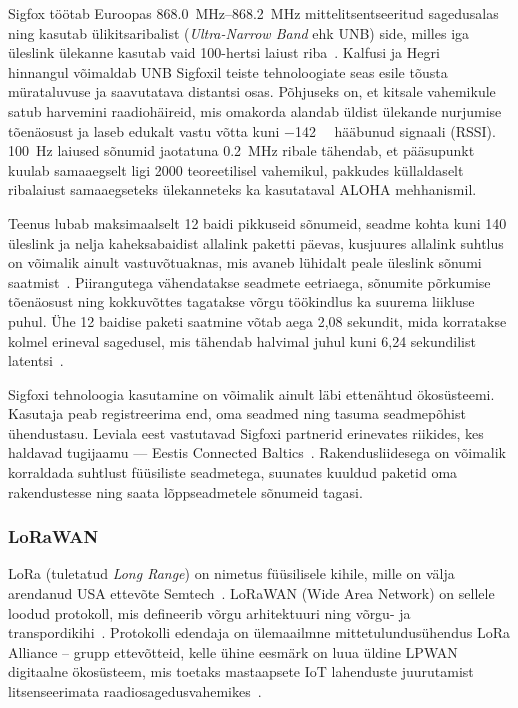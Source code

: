 \documentclass[12pt]{article}
\begin{document}
    Sigfox töötab Euroopas \SIrange{868.0}{868.2}{\mega\hertz} mittelitsentseeritud sagedusalas ning kasutab ülikitsaribalist (\textit{Ultra-Narrow Band} ehk UNB) side, milles iga üleslink ülekanne kasutab vaid 100-hertsi laiust riba~\cite{sigfoxtech}.
    Kalfusi ja Hegri~\cite{kalfus2016ultra} hinnangul võimaldab UNB Sigfoxil teiste tehnoloogiate seas esile tõusta mürataluvuse ja saavutatava distantsi osas.
    Põhjuseks on, et kitsale vahemikule satub harvemini raadiohäireid, mis omakorda alandab üldist ülekande nurjumise tõenäosust ja laseb edukalt vastu võtta kuni \SI{-142}{\deci\belm} hääbunud signaali (RSSI).
    \SI{100}{\hertz} laiused sõnumid jaotatuna \SI{0,2}{\mega\hertz} ribale tähendab, et pääsupunkt kuulab samaaegselt ligi 2000 teoreetilisel vahemikul, pakkudes küllaldaselt ribalaiust samaaegseteks ülekanneteks ka kasutataval ALOHA mehhanismil.

    Teenus lubab maksimaalselt 12 baidi pikkuseid sõnumeid, seadme kohta kuni 140 üleslink ja nelja kaheksabaidist allalink paketti päevas, kusjuures allalink suhtlus on võimalik ainult vastuvõtuaknas, mis avaneb lühidalt peale üleslink sõnumi saatmist~\cite{sigfoxtech}.
    Piirangutega vähendatakse seadmete eetriaega, sõnumite põrkumise tõenäosust ning kokkuvõttes tagatakse võrgu töökindlus ka suurema liikluse puhul.
    Ühe 12 baidise paketi saatmine võtab aega 2,08 sekundit, mida korratakse kolmel erineval sagedusel, mis tähendab halvimal juhul kuni 6,24 sekundilist latentsi~\cite{sigfoxtech}.

    Sigfoxi tehnoloogia kasutamine on võimalik ainult läbi ettenähtud ökosüsteemi.
    Kasutaja peab registreerima end, oma seadmed ning tasuma seadmepõhist ühendustasu.
    Leviala eest vastutavad Sigfoxi partnerid erinevates riikides, kes haldavad tugijaamu — Eestis Connected Baltics~\cite{sfCoverage}.
    Rakendusliidesega on võimalik korraldada suhtlust füüsiliste seadmetega, suunates kuuldud paketid oma rakendustesse ning saata lõppseadmetele sõnumeid tagasi.

    \subsubsection{LoRaWAN}

    LoRa (tuletatud \textit{Long Range}) on nimetus füüsilisele kihile, mille on välja arendanud USA ettevõte Semtech~\cite{loraIntro}.
    LoRaWAN (Wide Area Network) on sellele loodud protokoll, mis defineerib võrgu arhitektuuri ning võrgu- ja transpordikihi~\cite{lorawanIntro}.
    Protokolli edendaja on ülemaailmne mittetulundusühendus LoRa Alliance -- grupp ettevõtteid, kelle ühine eesmärk on luua üldine LPWAN digitaalne ökosüsteem, mis toetaks mastaapsete IoT lahenduste juurutamist litsenseerimata raadiosagedusvahemikes~\cite{loraalliance}.
\end{document}
